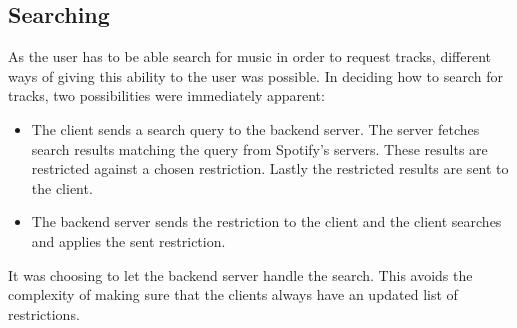 \subsection{Searching}
As the user has to be able search for music in order to request tracks, different ways of giving this ability to the user was possible. In deciding how to search for tracks, two possibilities were immediately apparent:

\begin{itemize}
  \item The client sends a search query to the backend server. The
    server fetches search results matching the query from Spotify's servers. These results are restricted against a chosen restriction. Lastly the restricted results are sent to the client.
  \item The backend server sends the restriction to the client and the client searches and applies the sent restriction.
\end{itemize}

It was choosing to let the backend server handle the search. This avoids the complexity of making sure that the clients always have an updated list of restrictions.
